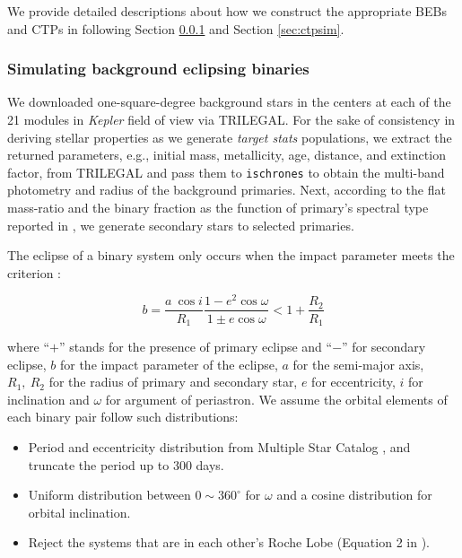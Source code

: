 \documentclass{aastex63}
\begin{document}
We provide detailed descriptions about how we construct the appropriate BEBs and CTPs in following Section \ref{sec:bebsim} and Section \ref{sec:ctpsim}.

\subsubsection{Simulating background eclipsing binaries}
    \label{sec:bebsim}

    We downloaded one-square-degree background stars in the centers at each of the 21 modules in \emph{Kepler} field of view via TRILEGAL. For the sake of consistency in deriving stellar properties as we generate \emph{target stats} populations, we extract the returned parameters, e.g., initial mass, metallicity, age, distance, and extinction factor, from TRILEGAL and pass them to \texttt{ischrones} to obtain the multi-band photometry and radius of the background primaries. Next, according to the flat mass-ratio and the binary fraction as the function of primary's spectral type reported in \cite{Raghavan2010}, we generate secondary stars to selected primaries.
    
    The eclipse of a binary system only occurs when the impact parameter meets the criterion \citep{Winn2010}:
    
    \begin{equation}
     b = \frac{a~\cos i}{R_1} \frac{1-e^2\cos \omega}{1 \pm e \cos\omega} < 1 + \frac{R_2}{R_1}
    \end{equation}
    
    where ``$ + $'' stands for the presence of primary eclipse and ``$-$'' for secondary eclipse, $b$ for the impact parameter of the eclipse, $a$ for the semi-major axis, $R_1,~R_2$ for the radius of primary and secondary star, $e$ for eccentricity, $i$ for inclination and $\omega$ for argument of periastron. We assume the orbital elements of each binary pair follow such distributions:
    
    \begin{itemize}
        \item Period and eccentricity distribution from Multiple Star Catalog \citep{Tokovinin2018}, and truncate the period up to 300 days.
        \item Uniform distribution between $0 \sim 360^\circ$ for $\omega$ and a cosine distribution for orbital inclination.
        \item Reject the systems that are in each other's Roche Lobe (Equation 2 in \cite{1983ApJ...268..368E}). 
    \end{itemize}
    
\end{document}
